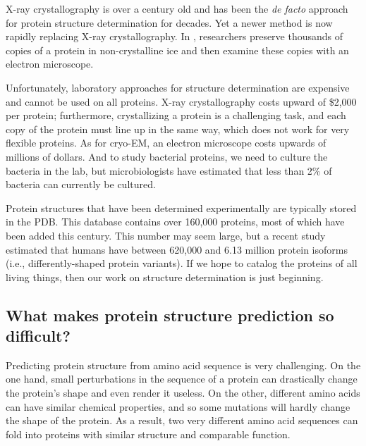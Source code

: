 X-ray crystallography is over a century old and has been the \textit{de facto} approach for protein structure determination for decades. Yet a newer method is now rapidly replacing X-ray crystallography. In , researchers preserve thousands of copies of a protein in non-crystalline ice and then examine these copies with an electron microscope.

Unfortunately, laboratory approaches for structure determination are expensive and cannot be used on all proteins. X-ray crystallography costs upward of \$2,000 per protein; furthermore, crystallizing a protein is a challenging task, and each copy of the protein must line up in the same way, which does not work for very flexible proteins. As for cryo-EM, an electron microscope costs upwards of millions of dollars. And to study bacterial proteins, we need to culture the bacteria in the lab, but microbiologists have estimated that less than 2\% of bacteria can currently be cultured.

Protein structures that have been determined experimentally are typically stored in the PDB. This database contains over 160,000 proteins, most of which have been added this century. This number may seem large, but a recent study estimated that humans have between 620,000 and 6.13 million protein isoforms (i.e., differently-shaped protein variants). If we hope to catalog the proteins of all living things, then our work on structure determination is just beginning.

\FloatBarrier
{}
\subsection{What makes protein structure prediction so difficult?}

Predicting protein structure from amino acid sequence is very challenging. On the one hand, small perturbations in the sequence of a protein can drastically change the protein's shape and even render it useless. On the other, different amino acids can have similar chemical properties, and so some mutations will hardly change the shape of the protein. As a result, two very different amino acid sequences can fold into proteins with similar structure and comparable function.

